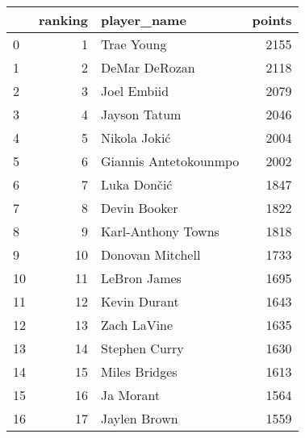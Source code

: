 \begin{tabular}{lrlr}
\toprule
{} &  ranking &            player\_name &  points \\
\midrule
0  &        1 &             Trae Young &    2155 \\
1  &        2 &          DeMar DeRozan &    2118 \\
2  &        3 &            Joel Embiid &    2079 \\
3  &        4 &           Jayson Tatum &    2046 \\
4  &        5 &           Nikola Jokić &    2004 \\
5  &        6 &  Giannis Antetokounmpo &    2002 \\
6  &        7 &            Luka Dončić &    1847 \\
7  &        8 &           Devin Booker &    1822 \\
8  &        9 &     Karl-Anthony Towns &    1818 \\
9  &       10 &       Donovan Mitchell &    1733 \\
10 &       11 &           LeBron James &    1695 \\
11 &       12 &           Kevin Durant &    1643 \\
12 &       13 &            Zach LaVine &    1635 \\
13 &       14 &          Stephen Curry &    1630 \\
14 &       15 &          Miles Bridges &    1613 \\
15 &       16 &              Ja Morant &    1564 \\
16 &       17 &           Jaylen Brown &    1559 \\
\bottomrule
\end{tabular}
